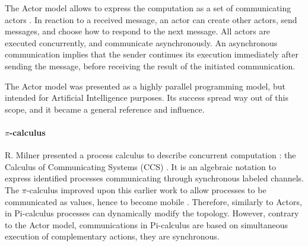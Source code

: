 The Actor model allows to express the computation as a set of communicating actors \cite{Hewitt1973a, Hewitt1977, Clinger1981}.
In reaction to a received message, an actor can create other actors, send messages, and choose how to respond to the next message.
All actors are executed concurrently, and communicate asynchronously.
An asynchronous communication implies that the sender continues its execution immediately after sending the message, before receiving the result of the initiated communication.

The Actor model was presented as a highly parallel programming model, but intended for Artificial Intelligence purposes.
Its success spread way out of this scope, and it became a general reference and influence.


\paragraph{$\pi$-calculus}

R. Milner presented a process calculus to describe concurrent computation : the Calculus of Communicating Systems (CCS) \cite{Milner1975, Milner1980}.
It is an algebraic notation to express identified processes communicating through synchronous labeled channels.
The $\pi$-calculus improved upon this earlier work to allow processes to be communicated as values, hence to become mobile \cite{Engberg1986,Milner1992a,Milner1992}.
Therefore, similarly to Actors, in Pi-calculus processes can dynamically modify the topology.
However, contrary to the Actor model, communications in Pi-calculus are based on simultaneous execution of complementary actions, they are synchronous.





